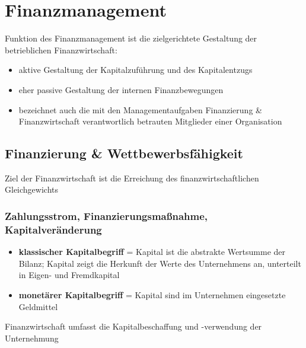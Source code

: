 \documentclass[11pt]{article}
\date{\today}
\title{}
\begin{document}
\tableofcontents

\section{Finanzmanagement}
\label{sec:orgac0718c}
Funktion des Finanzmanagement ist die zielgerichtete Gestaltung der betrieblichen Finanzwirtschaft:
\begin{itemize}
\item aktive Gestaltung der Kapitalzuführung und des Kapitalentzugs
\item eher passive Gestaltung der internen Finanzbewegungen
\item bezeichnet auch die mit den Managementaufgaben Finanzierung \& Finanzwirtschaft verantwortlich betrauten Mitglieder einer Organisation
\end{itemize}
\subsection{Finanzierung \& Wettbewerbsfähigkeit}
\label{sec:org03f0377}
Ziel der Finanzwirtschaft ist die Erreichung des finanzwirtschaftlichen Gleichgewichts
\subsubsection{Zahlungsstrom, Finanzierungsmaßnahme, Kapitalveränderung}
\label{sec:org493b0d7}
\begin{itemize}
\item \textbf{klassischer Kapitalbegriff} = Kapital ist die abstrakte Wertsumme der Bilanz; Kapital zeigt die Herkunft der Werte des Unternehmens an, unterteilt in Eigen- und Fremdkapital
\item \textbf{monetärer Kapitalbegriff} = Kapital sind im Unternehmen eingesetzte Geldmittel
\end{itemize}

Finanzwirtschaft umfasst die Kapitalbeschaffung und -verwendung der Unternehmung
\end{document}
